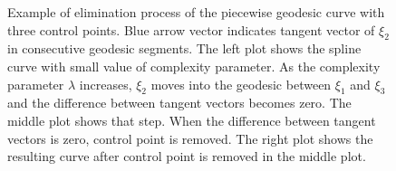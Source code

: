 \begin{figure}

{\centering {}

}

\caption{Example of elimination process of the piecewise geodesic curve with three control points. Blue arrow vector indicates tangent vector of $\xi_2$ in consecutive geodesic segments. The left plot shows the spline curve with small value of complexity parameter. As the complexity parameter $\lambda$ increases, $\xi_2$ moves into the geodesic between $\xi_1$ and $\xi_3$ and the difference between tangent vectors becomes zero. The middle plot shows that step. When the difference between tangent vectors is zero, control point is removed. The right plot shows the resulting curve after control point is removed in the middle plot.}\label{fig:elimination}
\end{figure}

